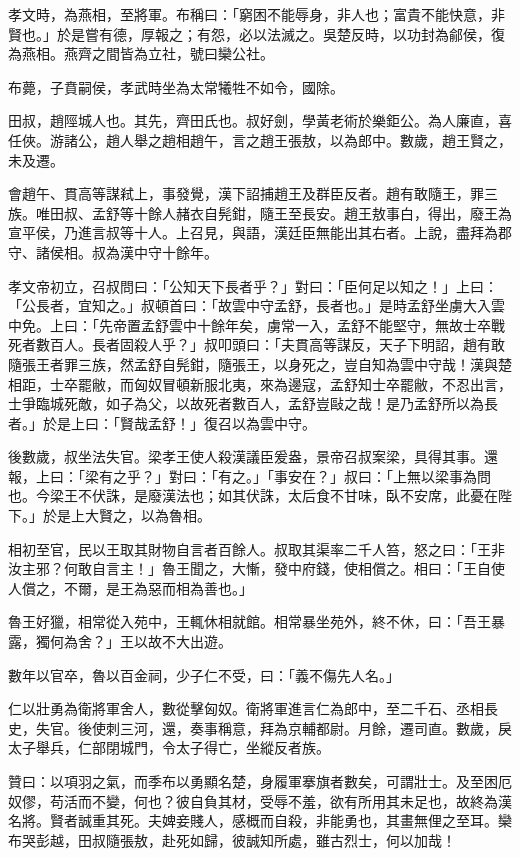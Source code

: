 \begin{pinyinscope}
孝文時，為燕相，至將軍。布稱曰：「窮困不能辱身，非人也；富貴不能快意，非賢也。」於是嘗有德，厚報之；有怨，必以法滅之。吳楚反時，以功封為鄃侯，復為燕相。燕齊之間皆為立社，號曰欒公社。

布薨，子賁嗣侯，孝武時坐為太常犧牲不如令，國除。

田叔，趙陘城人也。其先，齊田氏也。叔好劍，學黃老術於樂鉅公。為人廉直，喜任俠。游諸公，趙人舉之趙相趙午，言之趙王張敖，以為郎中。數歲，趙王賢之，未及遷。

會趙午、貫高等謀弒上，事發覺，漢下詔捕趙王及群臣反者。趙有敢隨王，罪三族。唯田叔、孟舒等十餘人赭衣自髡鉗，隨王至長安。趙王敖事白，得出，廢王為宣平侯，乃進言叔等十人。上召見，與語，漢廷臣無能出其右者。上說，盡拜為郡守、諸侯相。叔為漢中守十餘年。

孝文帝初立，召叔問曰：「公知天下長者乎？」對曰：「臣何足以知之！」上曰：「公長者，宜知之。」叔頓首曰：「故雲中守孟舒，長者也。」是時孟舒坐虜大入雲中免。上曰：「先帝置孟舒雲中十餘年矣，虜常一入，孟舒不能堅守，無故士卒戰死者數百人。長者固殺人乎？」叔叩頭曰：「夫貫高等謀反，天子下明詔，趙有敢隨張王者罪三族，然孟舒自髡鉗，隨張王，以身死之，豈自知為雲中守哉！漢與楚相距，士卒罷敝，而匈奴冒頓新服北夷，來為邊寇，孟舒知士卒罷敝，不忍出言，士爭臨城死敵，如子為父，以故死者數百人，孟舒豈敺之哉！是乃孟舒所以為長者。」於是上曰：「賢哉孟舒！」復召以為雲中守。

後數歲，叔坐法失官。梁孝王使人殺漢議臣爰盎，景帝召叔案梁，具得其事。還報，上曰：「梁有之乎？」對曰：「有之。」「事安在？」叔曰：「上無以梁事為問也。今梁王不伏誅，是廢漢法也；如其伏誅，太后食不甘味，臥不安席，此憂在陛下。」於是上大賢之，以為魯相。

相初至官，民以王取其財物自言者百餘人。叔取其渠率二千人笞，怒之曰：「王非汝主邪？何敢自言主！」魯王聞之，大慚，發中府錢，使相償之。相曰：「王自使人償之，不爾，是王為惡而相為善也。」

魯王好獵，相常從入苑中，王輒休相就館。相常暴坐苑外，終不休，曰：「吾王暴露，獨何為舍？」王以故不大出遊。

數年以官卒，魯以百金祠，少子仁不受，曰：「義不傷先人名。」

仁以壯勇為衛將軍舍人，數從擊匈奴。衛將軍進言仁為郎中，至二千石、丞相長史，失官。後使刺三河，還，奏事稱意，拜為京輔都尉。月餘，遷司直。數歲，戾太子舉兵，仁部閉城門，令太子得亡，坐縱反者族。

贊曰：以項羽之氣，而季布以勇顯名楚，身履軍搴旗者數矣，可謂壯士。及至困厄奴僇，苟活而不變，何也？彼自負其材，受辱不羞，欲有所用其未足也，故終為漢名將。賢者誠重其死。夫婢妾賤人，感概而自殺，非能勇也，其畫無俚之至耳。欒布哭彭越，田叔隨張敖，赴死如歸，彼誠知所處，雖古烈士，何以加哉！


\end{pinyinscope}